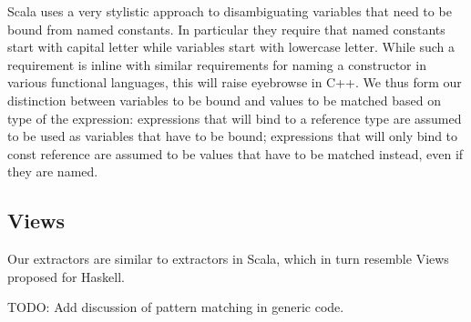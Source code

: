 \documentclass[preprint]{sigplanconf}
\begin{document}
Scala uses a very stylistic approach to disambiguating variables that need to be 
bound from named constants. In particular they require that named constants 
start with capital letter while variables start with lowercase 
letter\cite[]{EmirPhd}. While such a requirement is inline with similar 
requirements for naming a constructor in various functional languages, this will 
raise eyebrowse in C++. We thus form our distinction between variables to be 
bound and values to be matched based on type of the expression: expressions that 
will bind to a reference type are assumed to be used as variables that have to 
be bound; expressions that will only bind to const reference are assumed to be 
values that have to be matched instead, even if they are named.

\subsection{Views}

Our extractors are similar to extractors in Scala, which in turn resemble Views 
proposed for Haskell.

TODO: Add discussion of pattern matching in generic code.



\end{document}
